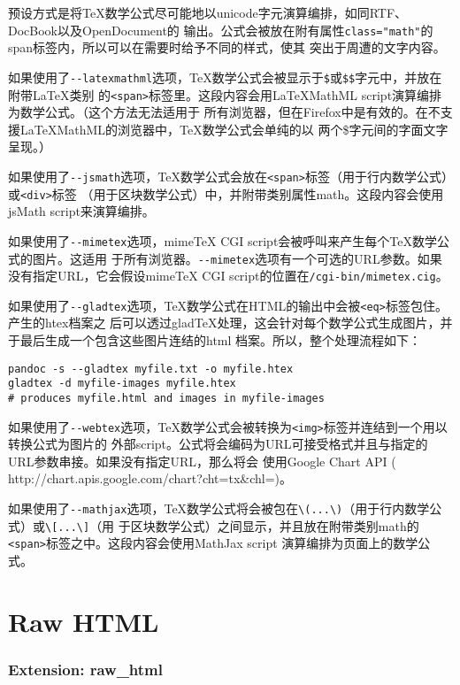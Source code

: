 \documentclass[fancyhdr,bookmark]{ctexbook}
\begin{document}
预设方式是将TeX数学公式尽可能地以unicode字元演算编排，如同RTF、DocBook以及OpenDocument的
输出。公式会被放在附有属性\lstinline!class="math"!的span标签内，所以可以在需要时给予不同的样式，使其
突出于周遭的文字内容。

如果使用了\lstinline!--latexmathml!选项，TeX数学公式会被显示于\lstinline!$!或\lstinline!$$!字元中，并放在附带LaTeX类别
的\lstinline!<span>!标签里。这段内容会用LaTeXMathML
script演算编排为数学公式。（这个方法无法适用于
所有浏览器，但在Firefox中是有效的。在不支援LaTeXMathML的浏览器中，TeX数学公式会单纯的以
两个\$字元间的字面文字呈现。）

如果使用了\lstinline!--jsmath!选项，TeX数学公式会放在\lstinline!<span>!标签（用于行内数学公式）或\lstinline!<div>!标签
（用于区块数学公式）中，并附带类别属性math。这段内容会使用jsMath
script来演算编排。

如果使用了\lstinline!--mimetex!选项，mimeTeX CGI
script会被呼叫来产生每个TeX数学公式的图片。这适用
于所有浏览器。\lstinline!--mimetex!选项有一个可选的URL参数。如果没有指定URL，它会假设mimeTeX
CGI script的位置在\lstinline!/cgi-bin/mimetex.cig!。

如果使用了\lstinline!--gladtex!选项，TeX数学公式在HTML的输出中会被\lstinline!<eq>!标签包住。产生的htex档案之
后可以透过gladTeX处理，这会针对每个数学公式生成图片，并于最后生成一个包含这些图片连结的html
档案。所以，整个处理流程如下：

\begin{lstlisting}
pandoc -s --gladtex myfile.txt -o myfile.htex
gladtex -d myfile-images myfile.htex
# produces myfile.html and images in myfile-images
\end{lstlisting}

如果使用了\lstinline!--webtex!选项，TeX数学公式会被转换为\lstinline!<img>!标签并连结到一个用以转换公式为图片的
外部script。公式将会编码为URL可接受格式并且与指定的URL参数串接。如果没有指定URL，那么将会
使用Google Chart API (
http://chart.apis.google.com/chart?cht=tx\&chl=)。

如果使用了\lstinline!--mathjax!选项，TeX数学公式将会被包在\lstinline!\(...\)!（用于行内数学公式）或\lstinline!\[...\]!（用
于区块数学公式）之间显示，并且放在附带类别math的\lstinline!<span>!标签之中。这段内容会使用MathJax
script 演算编排为页面上的数学公式。

\section{Raw HTML}\label{raw-html}

\subsubsection{Extension: raw\_html}\label{extension-raw_html}
\end{document}
